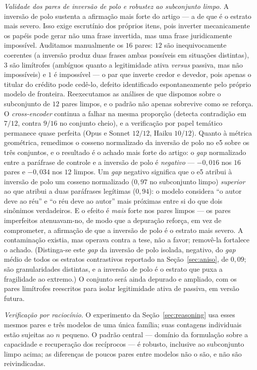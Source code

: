 \documentclass[11pt]{article}
\begin{document}
\textit{Validade dos pares de inversão de polo e robustez ao subconjunto limpo.}
A inversão de polo sustenta a afirmação mais forte do artigo --- a de que é o
estrato mais severo. Isso exige escrutínio dos próprios itens, pois inverter
mecanicamente os papéis pode gerar não uma frase invertida, mas uma frase
juridicamente impossível. Auditamos manualmente os $16$ pares: $12$ são
inequivocamente coerentes (a inversão produz duas frases ambas possíveis em
situações distintas), $3$ são limítrofes (ambíguos quanto a legitimidade ativa
\textit{versus} passiva, mas não impossíveis) e $1$ é impossível --- o par que
inverte credor e devedor, pois apenas o titular do crédito pode cedê-lo, defeito
identificado espontaneamente pelo próprio modelo de fronteira. Reexecutamos as
análises de que dispomos sobre o subconjunto de $12$ pares limpos, e o padrão não
apenas sobrevive como se reforça. O \textit{cross-encoder} continua a falhar na
mesma proporção (detecta contradição em $7/12$, contra $9/16$ no conjunto cheio), e
a verificação por papel temático permanece quase perfeita (Opus e Sonnet $12/12$,
Haiku $10/12$). Quanto à métrica geométrica, remedimos o cosseno normalizado da
inversão de polo no e5 sobre os três conjuntos, e o resultado é o achado mais forte
do artigo: o \textit{gap} normalizado entre a paráfrase de controle e a inversão de
polo é \emph{negativo} --- $-0{,}016$ nos $16$ pares e $-0{,}034$ nos $12$ limpos.
Um \textit{gap} negativo significa que o e5 atribui à inversão de polo um cosseno
normalizado ($0{,}97$ no subconjunto limpo) \emph{superior} ao que atribui a duas
paráfrases legítimas ($0{,}94$): o modelo considera ``o autor deve ao réu'' e ``o
réu deve ao autor'' mais próximas entre si do que dois sinônimos verdadeiros. E o
efeito é \emph{mais} forte nos pares limpos --- os pares imperfeitos atenuavam-no,
de modo que a depuração reforça, em vez de comprometer, a afirmação de que a
inversão de polo é o estrato mais severo. A contaminação existia, mas operava
contra a tese, não a favor; removê-la fortalece o achado. (Distinga-se este
\textit{gap} da inversão de polo isolada, negativo, do \textit{gap} médio de todos
os estratos contrastivos reportado na Seção~\ref{sec:aniso}, de $0{,}09$; são
granularidades distintas, e a inversão de polo é o estrato que puxa a fragilidade
ao extremo.) O conjunto será ainda depurado e ampliado, com os pares limítrofes
reescritos para isolar legitimidade ativa de passiva, em versão futura.

\textit{Verificação por raciocínio.} O experimento da Seção~\ref{sec:reasoning}
usa esses mesmos pares e três modelos de uma única família; suas contagens
individuais estão sujeitas ao $n$ pequeno. O padrão central --- domínio da
formulação sobre a capacidade e recuperação dos recíprocos --- é robusto, inclusive
ao subconjunto limpo acima; as diferenças de poucos pares entre modelos não o são,
e não são reivindicadas.
\end{document}
